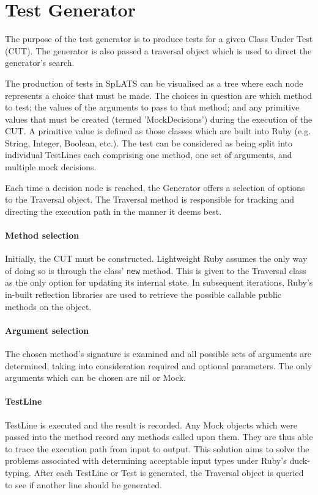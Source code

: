   \section{Test Generator}
    The purpose of the test generator is to produce tests for a given Class
Under Test (CUT). The generator is also passed a traversal object which is used
to direct the generator's search.

    The production of tests in SpLATS can be visualised as a tree where each
node represents a choice that must be made. The choices in question are which
method to test; the values of the arguments to pass to that method; and any primitive
values that must be created (termed 'MockDecisions') during the execution of the CUT. A primitive value is defined as those classes which are built into Ruby (e.g. String, Integer, Boolean, etc.).
    The test can be considered as being split into individual TestLines each comprising one
method, one set of arguments, and multiple mock decisions.


    Each time a decision node is reached, the Generator offers a selection of options to the Traversal object. The Traversal method is responsible for tracking and directing the execution path in the manner it deems best.
    
    \paragraph{Method selection} Initially, the CUT must be constructed. Lightweight Ruby assumes the only way of doing so is through the class' \texttt{new} method. This is given to the Traversal class as the only option for updating its internal state. In subsequent iterations, Ruby's in-built reflection libraries are used to retrieve the possible callable public methods on the object.
    
    \paragraph{Argument selection} The chosen method's signature is examined and all possible sets of arguments are determined, taking into consideration required and optional parameters. The only arguments which can be chosen are nil or Mock.
    
    \paragraph{TestLine} TestLine is executed and the result is recorded. Any Mock objects which were passed into the method record any methods called upon them. They are thus able to trace the execution path from input to output. This solution aims to solve the problems associated with determining acceptable input types under Ruby's duck-typing. After each TestLine or Test is generated, the Traversal object is queried to see if another line should be generated.
    
